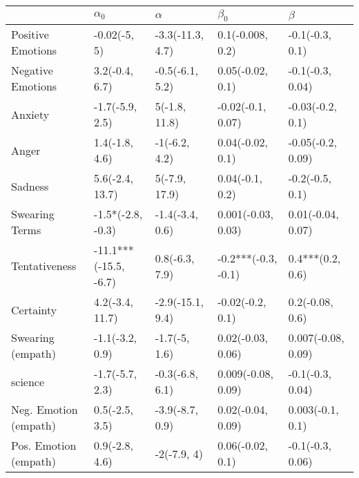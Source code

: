 \begin{tabular}{lllll}
\toprule
{} &             $\alpha_0$ &          $\alpha$ &            $\beta_0$ &             $\beta$ \\
\midrule
Positive Emotions     &           -0.02(-5, 5) &  -3.3(-11.3, 4.7) &     0.1(-0.008, 0.2) &     -0.1(-0.3, 0.1) \\
Negative Emotions     &         3.2(-0.4, 6.7) &   -0.5(-6.1, 5.2) &     0.05(-0.02, 0.1) &    -0.1(-0.3, 0.04) \\
Anxiety               &        -1.7(-5.9, 2.5) &     5(-1.8, 11.8) &    -0.02(-0.1, 0.07) &    -0.03(-0.2, 0.1) \\
Anger                 &         1.4(-1.8, 4.6) &     -1(-6.2, 4.2) &     0.04(-0.02, 0.1) &   -0.05(-0.2, 0.09) \\
Sadness               &        5.6(-2.4, 13.7) &     5(-7.9, 17.9) &      0.04(-0.1, 0.2) &     -0.2(-0.5, 0.1) \\
Swearing Terms        &      -1.5*(-2.8, -0.3) &   -1.4(-3.4, 0.6) &   0.001(-0.03, 0.03) &   0.01(-0.04, 0.07) \\
Tentativeness         &  -11.1***(-15.5, -6.7) &    0.8(-6.3, 7.9) &  -0.2***(-0.3, -0.1) &    0.4***(0.2, 0.6) \\
Certainty             &        4.2(-3.4, 11.7) &  -2.9(-15.1, 9.4) &     -0.02(-0.2, 0.1) &     0.2(-0.08, 0.6) \\
Swearing (empath)     &        -1.1(-3.2, 0.9) &     -1.7(-5, 1.6) &    0.02(-0.03, 0.06) &  0.007(-0.08, 0.09) \\
science               &        -1.7(-5.7, 2.3) &   -0.3(-6.8, 6.1) &   0.009(-0.08, 0.09) &    -0.1(-0.3, 0.04) \\
Neg. Emotion (empath) &         0.5(-2.5, 3.5) &   -3.9(-8.7, 0.9) &    0.02(-0.04, 0.09) &    0.003(-0.1, 0.1) \\
Pos. Emotion (empath) &         0.9(-2.8, 4.6) &       -2(-7.9, 4) &     0.06(-0.02, 0.1) &    -0.1(-0.3, 0.06) \\
\bottomrule
\end{tabular}
